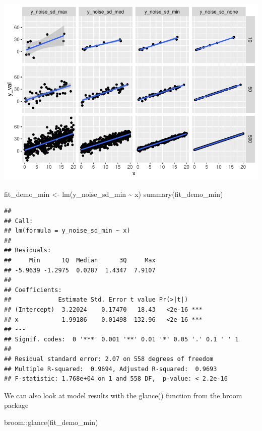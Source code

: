 \documentclass[
]{book}
\newenvironment{Shaded}{\begin{snugshade}}{\end{snugshade}}
\newcommand{\FunctionTok}[1]{\textcolor[rgb]{0.00,0.00,0.00}{#1}}
\newcommand{\NormalTok}[1]{#1}
\newcommand{\OtherTok}[1]{\textcolor[rgb]{0.56,0.35,0.01}{#1}}
\newcommand{\SpecialCharTok}[1]{\textcolor[rgb]{0.00,0.00,0.00}{#1}}
\begin{document}
\includegraphics{test_course_notes_files/figure-latex/unnamed-chunk-85-1.pdf}

\begin{Shaded}
\begin{Highlighting}[]
\NormalTok{fit\_demo\_min }\OtherTok{\textless{}{-}} \FunctionTok{lm}\NormalTok{(y\_noise\_sd\_min }\SpecialCharTok{\textasciitilde{}}\NormalTok{ x)}
\FunctionTok{summary}\NormalTok{(fit\_demo\_min)}
\end{Highlighting}
\end{Shaded}

\begin{verbatim}
## 
## Call:
## lm(formula = y_noise_sd_min ~ x)
## 
## Residuals:
##     Min      1Q  Median      3Q     Max 
## -5.9639 -1.2975  0.0287  1.4347  7.9107 
## 
## Coefficients:
##             Estimate Std. Error t value Pr(>|t|)    
## (Intercept)  3.22024    0.17470   18.43   <2e-16 ***
## x            1.99186    0.01498  132.96   <2e-16 ***
## ---
## Signif. codes:  0 '***' 0.001 '**' 0.01 '*' 0.05 '.' 0.1 ' ' 1
## 
## Residual standard error: 2.07 on 558 degrees of freedom
## Multiple R-squared:  0.9694, Adjusted R-squared:  0.9693 
## F-statistic: 1.768e+04 on 1 and 558 DF,  p-value: < 2.2e-16
\end{verbatim}

We can also look at model results with the glance() function from the broom package

\begin{Shaded}
\begin{Highlighting}[]
\NormalTok{broom}\SpecialCharTok{::}\FunctionTok{glance}\NormalTok{(fit\_demo\_min)}
\end{Highlighting}
\end{Shaded}
\end{document}
